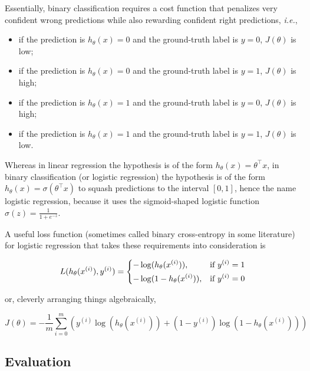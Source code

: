 Essentially, binary classification requires a cost function that penalizes very confident wrong predictions while also rewarding confident right predictions, \textit{i.e.},

\begin{itemize}
    \item if the prediction is $h_{\theta}(x) = 0$ and the ground-truth label is $y = 0$, $J(\theta)$ is low;
    \item if the prediction is $h_{\theta}(x) = 0$ and the ground-truth label is $y = 1$, $J(\theta)$ is high;
    \item if the prediction is $h_{\theta}(x) = 1$ and the ground-truth label is $y = 0$, $J(\theta)$ is high;
    \item if the prediction is $h_{\theta}(x) = 1$ and the ground-truth label is $y = 1$, $J(\theta)$ is low.
\end{itemize}

Whereas in linear regression the hypothesis is of the form $h_{\theta}(x) = \theta^{\top}x$, in binary classification (or logistic regression) the hypothesis is of the form $h_{\theta}(x) = \sigma(\theta^{\top}x)$ to squash predictions to the interval $[0, 1]$, hence the name logistic regression, because it uses the sigmoid-shaped logistic function $\sigma(z) = \frac{1}{1 + e^{-z}}$.

A useful loss function (sometimes called binary cross-entropy in some literature) for logistic regression that takes these requirements into consideration is

\begin{equation}
L(h_{\theta}(x^{(i)}), y^{(i)}) =
\begin{dcases}
    -\log(h_{\theta}(x^{(i)})),& \text{if } y^{(i)} = 1\\
    -\log(1 - h_{\theta}(x^{(i)})),& \text{if } y^{(i)} = 0
\end{dcases}
\end{equation}

or, cleverly arranging things algebraically,

\begin{equation}
J(\theta) = -\frac{1}{m} \sum_{i=0}^{m} ( y^{(i)}\log(h_{\theta}(x^{(i)})) + (1 - y^{(i)})\log(1 - h_{\theta}(x^{(i)})) )
\end{equation}

\subsection{Evaluation}

